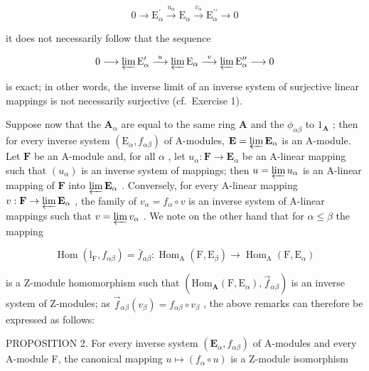 \[
0 \longrightarrow \mathrm{E} _ {\alpha} ^ {\prime} \stackrel {u _ {\alpha}} {\longrightarrow} \mathrm{E} _ {\alpha} \stackrel {v _ {\alpha}} {\longrightarrow} \mathrm{E} _ {\alpha} ^ {\prime \prime} \longrightarrow 0
\]

it does not necessarily follow that the sequence

\[
0 \longrightarrow \varprojlim \mathrm{E} _ {\alpha} ^ {\prime} \stackrel {u} {\longrightarrow} \varprojlim \mathrm{E} _ {\alpha} \stackrel {v} {\longrightarrow} \varprojlim \mathrm{E} _ {\alpha} ^ {\prime \prime} \longrightarrow 0
\]

is exact; in other words, the inverse limit of an inverse system of surjective linear mappings is not necessarily surjective (cf.~Exercise 1).

Suppose now that the \(\mathbf{A}_{\alpha}\) are equal to the same ring \(\mathbf{A}\) and the \(\phi_{\alpha \beta}\) to \(1_{\mathbf{A}}\) ; then for every inverse system \((\mathrm{E}_{\alpha}, f_{\alpha \beta})\) of A-modules, \(\mathbf{E} = \varprojlim \mathbf{E}_{\alpha}\) is an A-module. Let \(\mathbf{F}\) be an A-module and, for all \(\alpha\) , let \(u_{\alpha}: \mathbf{F} \to \mathbf{E}_{\alpha}\) be an A-linear mapping such that \((u_{\alpha})\) is an inverse system of mappings; then \(u = \varprojlim u_{\alpha}\) is an A-linear mapping of \(\mathbf{F}\) into \(\varprojlim \mathbf{E}_{\alpha}\) . Conversely, for every A-linear mapping \(v: \mathbf{F} \to \varprojlim \mathbf{E}_{\alpha}\) , the family of \(v_{\alpha} = f_{\alpha} \circ v\) is an inverse system of A-linear mappings such that \(v = \varprojlim v_{\alpha}\) . We note on the other hand that for \(\alpha \leqslant \beta\) the mapping

\[
\operatorname{Hom} \left(\mathrm{l} _ {\mathrm{F}}, f _ {\alpha \beta}\right) = \bar {f} _ {\alpha \beta}: \operatorname{Hom} _ {\mathrm{A}} (\mathrm{F}, \mathrm{E} _ {\beta}) \rightarrow \operatorname{Hom} _ {\mathrm{A}} (\mathrm{F}, \mathrm{E} _ {\alpha})
\]

is a Z-module homomorphism such that \((\mathrm{Hom}_{\mathbf{A}}(\mathrm{F}, \mathrm{E}_{\alpha}), \vec{f}_{\alpha\beta})\) is an inverse system of Z-modules; as \(\vec{f}_{\alpha\beta}(v_{\beta}) = f_{\alpha\beta} \circ v_{\beta}\) , the above remarks can therefore be expressed as follows:

PROPOSITION 2. For every inverse system \((\mathbf{E}_{\alpha}, f_{\alpha \beta})\) of A-modules and every A-module F, the canonical mapping \(u \mapsto (f_{\alpha} \circ u)\) is a Z-module isomorphism

